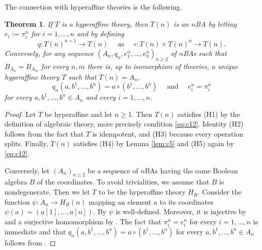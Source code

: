 \documentclass{amsart}
\numberwithin{equation}{section}
\theoremstyle{plain}
\newtheorem{theorem}{Theorem}[section]
\theoremstyle{definition}
\begin{document}
The connection with hyperaffine theories is the following.
\begin{theorem}
  \label{thm:nba}
  If $T$ is a hyperaffine theory, then $T(n)$ is an $n$BA by letting 
  $e_i:=\pi^n_i$ for $i =1,\ldots, n$ and by defining 
  \begin{equation*}
    q: T(n)^{n+1} \to T(n) \quad \text{ as } \quad \circ: T(n) \times T(n)^n \to T(n)\text{.}
  \end{equation*}
Conversely, for any sequence $(A_n, q_n, e^n_1, \ldots, e^n_n)_{n \ge 2}$ of $n$BAs such that $B_{A_n}=B_{A_m}$ for every $n,m$
there is, up to isomorphism of theories, a unique hyperaffine theory $T$ such that $T(n)=A_n$,  
  \begin{equation*}
    q_n(a, b^1, \ldots, b^n) = a \circ (b^1, \ldots, b^n) \quad \text{ and } \quad e^n_i = \pi^n_i
  \end{equation*}
  for every $a, b^1, \ldots, b^n \in A_n$ and every $i=1, \ldots, n$. 
\end{theorem}
\begin{proof}
  Let $T$ be hyperaffine and let $n \ge 1$.
  Then $T(n)$ satisfies (H1) by the definition of algebraic theory, more precisely condition \eqref{eq:c12}.  
  Identity (H2) follows from the fact that $T$ is idempotent, and (H3) because every operation splits. 
  Finally, $T(n)$ satisfies (H4) by Lemma \ref{lem:c5} and (H5) again by \eqref{eq:c12}. 

  Conversely, let $(A_n)_{n \ge 2}$ be a sequence of $n$BAs having the same Boolean algebra $B$ of the coordinates. 
  To avoid trivialities, we assume that $B$ is nondegenerate. 
  Then we let $T$ to be the hyperaffine theory $H_B$. 
  Consider the function $\psi: A_n \to H_B(n)$ mapping an element $a$ to its coordinates $\psi(a)=(a[1], \ldots, a[n])$. 
  By \cite[Lemma 8 (i)]{BLPS18} $\psi$ is well-defined. Moreover, it is injective by \cite[Lemma 9]{BLPS18} and a surjective homomorphism by \cite[Theorem 8]{BLPS18}. 
  The fact that $\pi^n_i = e^n_i$ for every $i=1, \ldots, n$ is immediate and that $q_n(a, b^1, \ldots, b^n) = a \circ (b^1, \ldots, b^n)$
  for every $a, b^1, \ldots, b^n \in A_n$ follows from \cite[Lemma 8(ii)]{BLPS18}.
\end{proof}
\end{document}
